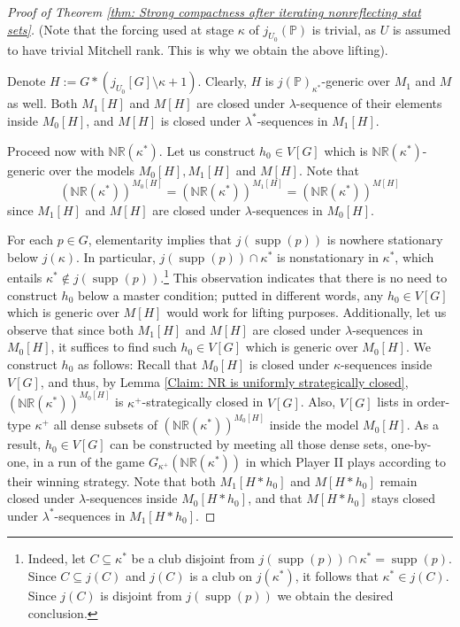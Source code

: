 \documentclass[11pt]{amsart}
\theoremstyle{definition}
\newcounter{condition}
\theoremstyle{remark}
\newcommand\<{{<}}
\DeclareMathOperator{\supp}{supp}
\def\s{\subseteq}
\newcommand{\po}{\mathbb{P}}
\begin{document}
\begin{proof}[Proof of Theorem \ref{thm: Strong compactness after iterating nonreflecting stat sets}]
(Note that the forcing used at stage $\kappa$ of $j_{U_0}(\po)$ is trivial, as $U$ is assumed to have  trivial Mitchell rank. This is why we obtain the above lifting).


Denote $H:=G\ast (j_{U_0}[G]\setminus \kappa+1)$. Clearly, $H$ is $j(\mathbb{P})_{\kappa^*}$-generic over $M_1$ and $M$ as well. Both $M_1[H]$ and $M[H]$ are closed under $\lambda$-sequence of their elements inside $M_0[H]$, and $M[H]$ is closed under $\lambda^*$-sequences in $M_1[H]$.

\smallskip

Proceed now with $\mathbb{NR}(\kappa^*)$. Let us construct $h_0\in V[G]$ which is $\mathbb{NR}(\kappa^*)$-generic over the models $M_0[H], M_1[H]$ and $M[H]$. {Note that $$(\mathbb{NR}(\kappa^*))^{M_0[H]} = (\mathbb{NR}(\kappa^*))^{M_1[H]} = (\mathbb{NR}(\kappa^*))^{M[H]}$$ since $M_1[H]$ and $M[H]$ are closed under $\lambda$-sequences in $M_0[H]$.} 


For each $p\in G$,  elementarity implies that  $j(\supp(p))$ is  nowhere stationary below $j(\kappa)$. In particular, $j(\supp(p))\cap \kappa^*$ is nonstationary in $\kappa^*$, which entails $\kappa^*\notin j(\supp(p))$.\footnote{Indeed, let $C\s \kappa^*$ be a club disjoint from $j(\supp(p))\cap \kappa^*=\supp(p)$. Since $C\s j(C)$ and $j(C)$ is a club on $j(\kappa^*)$, it follows that $\kappa^*\in j(C)$. Since $j(C)$ is disjoint from $j(\supp(p))$ we obtain the desired conclusion.} 
This observation  indicates that there is no need to construct $h_0$ below a master condition; putted in different  words, any $h_0\in V[G]$ which is generic over $M[H]$ would work for lifting purposes. Additionally, let us observe  that since both $M_1[H]$ and $M[H]$ are closed under $\lambda$-sequences in $M_0[H]$, it suffices to find such $h_0\in V[G]$ which is generic over $M_0[H]$. We construct $h_0$ as follows: Recall that $M_0[H]$ is closed under $\kappa$-sequences inside $V[G]$, and thus, by Lemma \ref{Claim: NR is uniformly strategically closed}, $(\mathbb{NR}(\kappa^*))^{M_0[H]}$ is $\kappa^+$-strategically closed in $V[G]$. Also, $V[G]$ lists in order-type $\kappa^+$ all dense subsets of $(\mathbb{NR}(\kappa^*))^{M_0[H]}$ inside the model $M_0[H]$. As a result, $h_0\in V[G]$ can be constructed by meeting all those dense sets, one-by-one, in a run of the game $G_{\kappa^+}(\mathbb{NR}(\kappa^*))$ in which Player II plays according to their winning strategy. Note that both $M_{1}[H*h_0]$ and $M[H*h_0]$ remain closed under $\lambda$-sequences inside $M_0[H\ast h_0]$, and that  $M[H*h_0]$ stays closed under $\lambda^*$-sequences in  $M_1[H*h_0]$.


\end{proof}
\end{document}
